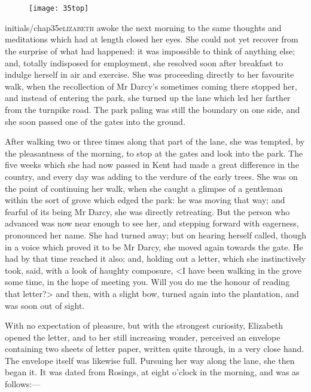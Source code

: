 \chapter[Chapter \thechapter]{}
	
	\begin{figure}[t!]
\centering
\texttt{[image: 35top]}
\end{figure}


\lettrine[lines=6,image=true]{initials/chap35e}{lizabeth}  awoke the next morning to the same thoughts and meditations which had at length closed her eyes. She could not yet recover from the surprise of what had happened: it was impossible to think of anything else; and, totally indisposed for employment, she resolved soon after breakfast to indulge herself in air and exercise. She was proceeding directly to her favourite walk, when the recollection of Mr Darcy's sometimes coming there stopped her, and instead of entering the park, she turned up the lane which led her farther from the turnpike road. The park paling was still the boundary on one side, and she soon passed one of the gates into the ground.

After walking two or three times along that part of the lane, she was tempted, by the pleasantness of the morning, to stop at the gates and look into the park. The five weeks which she had now passed in Kent had made a great difference in the country, and every day was adding to the verdure of the early trees. She was on the point of continuing her walk, when she caught a glimpse of a gentleman within the sort of grove which edged the park: he was moving that way; and fearful of its being Mr Darcy, she was directly retreating. But the person who advanced was now near enough to see her, and stepping forward with eagerness, pronounced her name. She had turned away; but on hearing herself called, though in a voice which proved it to be Mr Darcy, she moved again towards the gate. He had by that time reached it also; and, holding out a letter, which she instinctively took, said, with a look of haughty composure, <I have been walking in the grove some time, in the hope of meeting you. Will you do me the honour of reading that letter?> and then, with a slight bow, turned again into the plantation, and was soon out of sight.

With no expectation of pleasure, but with the strongest curiosity, Elizabeth opened the letter, and to her still increasing wonder, perceived an envelope containing two sheets of letter paper, written quite through, in a very close hand. The envelope itself was likewise full. Pursuing her way along the lane, she then began it. It was dated from Rosings, at eight o'clock in the morning, and was as follows:—

